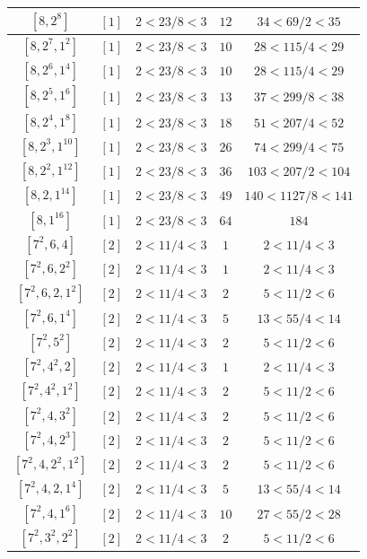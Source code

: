 \documentclass{article}%
\begin{document}
\begin{center}
\begin{longtable}{||c|c|c|c|c||}
$[8, 2^{8}]$ & $[1]$ & $2 < 23/8 < 3$ & $12$ & $34 < 69/2 < 35$ \\ \hline 
$[8, 2^{7}, 1^{2}]$ & $[1]$ & $2 < 23/8 < 3$ & $10$ & $28 < 115/4 < 29$ \\ \hline 
$[8, 2^{6}, 1^{4}]$ & $[1]$ & $2 < 23/8 < 3$ & $10$ & $28 < 115/4 < 29$ \\ \hline 
$[8, 2^{5}, 1^{6}]$ & $[1]$ & $2 < 23/8 < 3$ & $13$ & $37 < 299/8 < 38$ \\ \hline 
$[8, 2^{4}, 1^{8}]$ & $[1]$ & $2 < 23/8 < 3$ & $18$ & $51 < 207/4 < 52$ \\ \hline 
$[8, 2^{3}, 1^{10}]$ & $[1]$ & $2 < 23/8 < 3$ & $26$ & $74 < 299/4 < 75$ \\ \hline 
$[8, 2^{2}, 1^{12}]$ & $[1]$ & $2 < 23/8 < 3$ & $36$ & $103 < 207/2 < 104$ \\ \hline 
$[8, 2, 1^{14}]$ & $[1]$ & $2 < 23/8 < 3$ & $49$ & $140 < 1127/8 < 141$ \\ \hline 
$[8, 1^{16}]$ & $[1]$ & $2 < 23/8 < 3$ & $64$ & $184$ \\ \hline 
$[7^{2}, 6, 4]$ & $[2]$ & $2 < 11/4 < 3$ & $1$ & $2 < 11/4 < 3$ \\ \hline 
$[7^{2}, 6, 2^{2}]$ & $[2]$ & $2 < 11/4 < 3$ & $1$ & $2 < 11/4 < 3$ \\ \hline 
$[7^{2}, 6, 2, 1^{2}]$ & $[2]$ & $2 < 11/4 < 3$ & $2$ & $5 < 11/2 < 6$ \\ \hline 
$[7^{2}, 6, 1^{4}]$ & $[2]$ & $2 < 11/4 < 3$ & $5$ & $13 < 55/4 < 14$ \\ \hline 
$[7^{2}, 5^{2}]$ & $[2]$ & $2 < 11/4 < 3$ & $2$ & $5 < 11/2 < 6$ \\ \hline 
$[7^{2}, 4^{2}, 2]$ & $[2]$ & $2 < 11/4 < 3$ & $1$ & $2 < 11/4 < 3$ \\ \hline 
$[7^{2}, 4^{2}, 1^{2}]$ & $[2]$ & $2 < 11/4 < 3$ & $2$ & $5 < 11/2 < 6$ \\ \hline 
$[7^{2}, 4, 3^{2}]$ & $[2]$ & $2 < 11/4 < 3$ & $2$ & $5 < 11/2 < 6$ \\ \hline 
$[7^{2}, 4, 2^{3}]$ & $[2]$ & $2 < 11/4 < 3$ & $2$ & $5 < 11/2 < 6$ \\ \hline 
$[7^{2}, 4, 2^{2}, 1^{2}]$ & $[2]$ & $2 < 11/4 < 3$ & $2$ & $5 < 11/2 < 6$ \\ \hline 
$[7^{2}, 4, 2, 1^{4}]$ & $[2]$ & $2 < 11/4 < 3$ & $5$ & $13 < 55/4 < 14$ \\ \hline 
$[7^{2}, 4, 1^{6}]$ & $[2]$ & $2 < 11/4 < 3$ & $10$ & $27 < 55/2 < 28$ \\ \hline 
$[7^{2}, 3^{2}, 2^{2}]$ & $[2]$ & $2 < 11/4 < 3$ & $2$ & $5 < 11/2 < 6$ \\ \hline 

\end{longtable}
\end{center}
\end{document}
